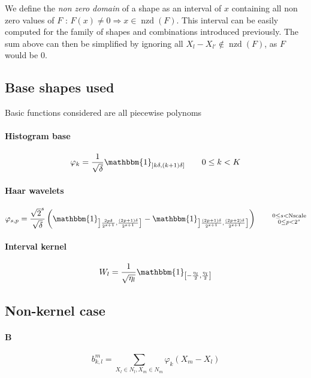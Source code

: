 \documentclass[a4paper,10pt]{article}
\newcommand\Indicator[1]{\mathbbm{1}_{#1}}
\DeclareMathOperator{\nzd}{nzd}
\begin{document}
We define the \emph{non zero domain} of a shape as an interval of $x$ containing all non zero values of $F$ : $F(x) \ne 0 \Rightarrow x \in \nzd(F)$.
This interval can be easily computed for the family of shapes and combinations introduced previously.
The sum above can then be simplified by ignoring all $X_l - X_{l'} \notin \nzd(F)$, as $F$ would be $0$.

\subsection{Base shapes used}
Basic functions considered are all piecewise polynoms

\paragraph{Histogram base}
\[ \varphi_k = \frac{1}{\sqrt{\delta}} \Indicator{\left] k\delta, (k+1)\delta \right]} \qquad 0 \le k < K \]

\paragraph{Haar wavelets}
\[ \varphi_{s,p} = \frac{\sqrt{2}^s}{\sqrt{\delta}} \left(
    \Indicator{ \left] \frac{2p \delta}{2^{s+1}}, \frac{(2p+1) \delta}{2^{s+1}} \right] } -
    \Indicator{ \left] \frac{(2p +1) \delta}{2^{s+1}}, \frac{(2p + 2) \delta}{2^{s+1}} \right] }
\right) \qquad \substack{0 \le s < \text{Nscale} \\ 0 \le p < 2^s} \]

\paragraph{Interval kernel}
\[ W_l = \frac{1}{\sqrt{\eta_l}} \Indicator{\left[ -\frac{\eta_l}{2}, \frac{\eta_l}{2} \right]} \]

\subsection{Non-kernel case}

\paragraph{B}
\[ b_{k,l}^m = \sum_{X_l \in N_l, X_m \in N_m} \varphi_k (X_m - X_l) \]
\end{document}
